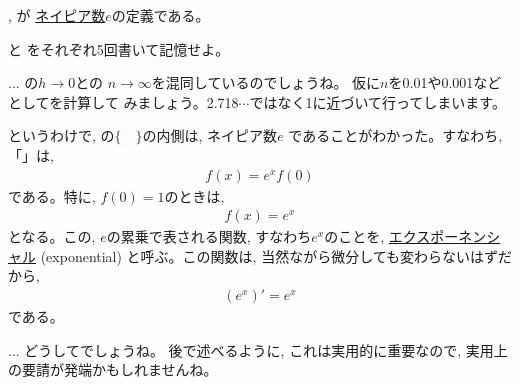 , が
\underline{ネイピア数}$e$の定義である。

\begin{q}\label{q:def_NapierNum} と
をそれぞれ5回書いて記憶せよ。\end{q}

\begin{freqmiss}{\small{} ... 
の$h\rightarrow0$との
$n\rightarrow\infty$を混同しているのでしょうね。
仮に$n$を0.01や0.001などとしてを計算して
みましょう。2.718$\cdots$ではなく1に近づいて行ってしまいます。}\end{freqmiss}

というわけで, の$\{\quad\}$の内側は, ネイピア数$e$
であることがわかった。すなわち, 「」は, 
\begin{eqnarray}
f(x)= e^x f(0)\label{eq:expexplain7}
\end{eqnarray}
である。特に, $f(0)=1$のときは, 
\begin{eqnarray}
f(x)=e^{x}
\end{eqnarray}
となる。この, $e$の累乗で表される関数, すなわち$e^x$のことを, 
\underline{エクスポーネンシャル} (exponential) 
と呼ぶ。この関数は, 当然ながら微分しても変わらないはずだから, 
\begin{eqnarray}
(e^x)'=e^x\label{eq:exp_diff}
\end{eqnarray}
である。

\begin{faq}\small{ ... どうしてでしょうね。
後で述べるように, これは実用的に重要なので, 
実用上の要請が発端かもしれませんね。}\end{faq}

